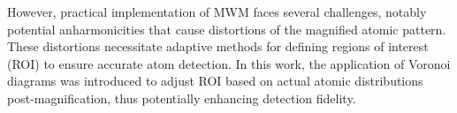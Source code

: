 However, practical implementation of MWM faces several challenges, notably potential anharmonicities that cause distortions of the magnified atomic pattern. These distortions necessitate adaptive methods for defining regions of interest (ROI) to ensure accurate atom detection. In this work, the application of Voronoi diagrams was introduced to adjust ROI based on actual atomic distributions post-magnification, thus potentially enhancing detection fidelity.












